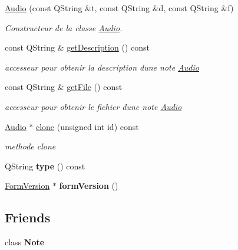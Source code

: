 \begin{DoxyCompactItemize}
\item 
\hyperlink{class_audio_aa3944e0eaa26e092079a60585456432a}{Audio} (const Q\+String \&t, const Q\+String \&d, const Q\+String \&f)
\begin{DoxyCompactList}\small\item\em Constructeur de la classe \hyperlink{class_audio}{Audio}. \end{DoxyCompactList}\item 
\mbox{\label{class_audio_ad76639dae8c86515da05898e207d86a0}} 
const Q\+String \& \hyperlink{class_audio_ad76639dae8c86515da05898e207d86a0}{get\+Description} () const
\begin{DoxyCompactList}\small\item\em accesseur pour obtenir la description d\textquotesingle{}une note \hyperlink{class_audio}{Audio} \end{DoxyCompactList}\item 
\mbox{\label{class_audio_a1957fb85c894e84902fdabeb160baaa3}} 
const Q\+String \& \hyperlink{class_audio_a1957fb85c894e84902fdabeb160baaa3}{get\+File} () const
\begin{DoxyCompactList}\small\item\em accesseur pour obtenir le fichier d\textquotesingle{}une note \hyperlink{class_audio}{Audio} \end{DoxyCompactList}\item 
\hyperlink{class_audio}{Audio} $\ast$ \hyperlink{class_audio_ae389c3ddd81187769876a1b1790be587}{clone} (unsigned int id) const
\begin{DoxyCompactList}\small\item\em methode clone \end{DoxyCompactList}\item 
\mbox{\label{class_audio_a17642cb22e0f2d8d998784497e5f0dca}} 
Q\+String {\bfseries type} () const
\item 
\mbox{\label{class_audio_ae2e6519331aa24cec01988ab2e5fa343}} 
\hyperlink{class_form_version}{Form\+Version} $\ast$ {\bfseries form\+Version} ()
\end{DoxyCompactItemize}
\subsection*{Friends}
\begin{DoxyCompactItemize}
\item 
\mbox{\label{class_audio_a93d7e72623acdfa5b079a11fbf2d9f9d}} 
class {\bfseries Note}
\end{DoxyCompactItemize}
